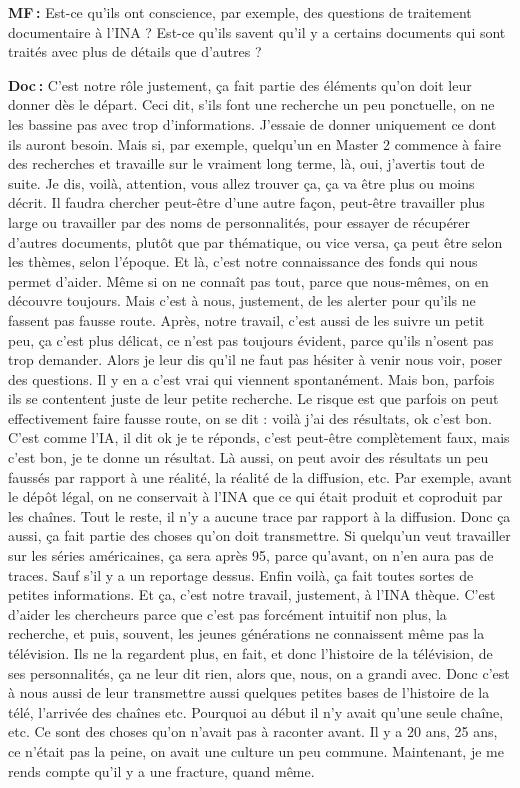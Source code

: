 \textbf{MF :} Est-ce qu'ils ont conscience, par exemple, des questions de traitement documentaire à l’INA ? Est-ce qu'ils savent qu'il y a certains documents qui sont traités avec plus de détails que d'autres ? 

\textbf{Doc :} C'est notre rôle justement, ça fait partie des éléments qu'on doit leur donner dès le départ. Ceci dit, s'ils font une recherche un peu ponctuelle, on ne les bassine pas avec trop d'informations. J'essaie de donner uniquement ce dont ils auront besoin. Mais si, par exemple, quelqu'un en Master 2 commence à faire des recherches et travaille sur le vraiment long terme, là, oui, j'avertis tout de suite. Je dis, voilà, attention, vous allez trouver ça, ça va être plus ou moins décrit. Il faudra chercher peut-être d'une autre façon, peut-être travailler plus large ou travailler par des noms de personnalités, pour essayer de récupérer d'autres documents, plutôt que par thématique, ou vice versa, ça peut être selon les thèmes, selon l'époque. Et là, c'est notre connaissance des fonds qui nous permet d'aider. Même si on ne connaît pas tout, parce que nous-mêmes, on en découvre toujours. Mais c'est à nous, justement, de les alerter pour qu'ils ne fassent pas fausse route. Après, notre travail, c'est aussi de les suivre un petit peu, ça c'est plus délicat, ce n'est pas toujours évident, parce qu'ils n'osent pas trop demander. Alors je leur dis qu’il ne faut pas hésiter à venir nous voir, poser des questions. Il y en a c'est vrai qui viennent spontanément. Mais bon, parfois ils se contentent juste de leur petite recherche. Le risque est que parfois on peut effectivement faire fausse route, on se dit : voilà j'ai des résultats, ok c'est bon. C'est comme l'IA, il dit ok je te réponds, c'est peut-être complètement faux, mais c'est bon, je te donne un résultat.  Là aussi, on peut avoir des résultats un peu faussés par rapport à une réalité, la réalité de la diffusion, etc. Par exemple, avant le dépôt légal, on ne conservait à l'INA que ce qui était produit et coproduit par les chaînes. Tout le reste, il n'y a aucune trace par rapport à la diffusion. Donc ça aussi, ça fait partie des choses qu'on doit transmettre. Si quelqu'un veut travailler sur les séries américaines, ça sera après 95, parce qu'avant, on n'en aura pas de traces. Sauf s'il y a un reportage dessus. Enfin voilà, ça fait toutes sortes de petites informations. Et ça, c'est notre travail, justement, à l’INA thèque. C'est d'aider les chercheurs parce que c'est pas forcément intuitif non plus, la recherche, et puis, souvent, les jeunes générations ne connaissent même pas la télévision. Ils ne la regardent plus, en fait, et donc l'histoire de la télévision, de ses personnalités, ça ne leur dit rien, alors que, nous, on a grandi avec. Donc c'est à nous aussi de leur transmettre aussi quelques petites bases de l'histoire de la télé, l'arrivée des chaînes etc. Pourquoi au début il n'y avait qu'une seule chaîne, etc. Ce sont des choses qu'on n'avait pas à raconter avant. Il y a 20 ans, 25 ans, ce n'était pas la peine, on avait une culture un peu commune.  Maintenant, je me rends compte qu'il y a une fracture, quand même.

